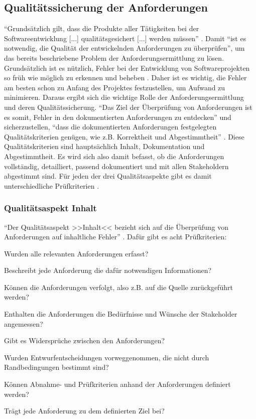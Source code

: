 \documentclass [12pt, a4paper, oneside, titlepage, ngerman]{article}
\begin{document}
\subsection{Qualitätssicherung der Anforderungen}
"`Grundsätzlich gilt, dass die Produkte aller Tätigkeiten bei der Softwareentwicklung [...] qualitätsgesichert [...] werden müssen"' \cite[S.55]{Winter1999}. Damit "`ist es notwendig, die Qualität der entwickelnden Anforderungen zu überprüfen"'\cite[S.95]{PohlRupp2015}, um das bereits beschriebene Problem der Anforderungsermittlung zu lösen. \\
Grundsätzlich ist es nützlich, Fehler bei der Entwicklung von Softwareprojekten so früh wie möglich zu erkennen und beheben \cite[vgl. S.2]{Hussmann}. Daher ist es wichtig, die Fehler am besten schon zu Anfang des Projektes festzustellen, um Aufwand zu minimieren. Daraus ergibt sich die wichtige Rolle der Anforderungsermittlung und deren Qualitätssicherung. 
"`Das Ziel der Überprüfung von Anforderungen ist es somit, Fehler in den dokumentierten Anforderungen zu entdecken"' und sicherzustellen, "`dass die dokumentierten Anforderungen festgelegten Qualitätskriterien genügen, wie z.B. Korrektheit und Abgestimmtheit"' \cite[S.95]{PohlRupp2015}. Diese Qualitätskriterien sind hauptsächlich Inhalt, Dokumentation und Abgestimmtheit. Es wird sich also damit befasst, ob die Anforderungen vollständig, detailliert, passend dokumentiert und mit allen Stakeholdern abgestimmt sind. Für jeden der drei Qualitätsaspekte gibt es damit unterschiedliche Prüfkriterien \cite[vgl.S. 97]{PohlRupp2015}.

\subsubsection{Qualitätsaspekt Inhalt}
"`Der Qualitätsaspekt >>Inhalt<< bezieht sich auf die Überprüfung von Anforderungen auf inhaltliche Fehler"' \cite[S.98]{PohlRupp2015}. Dafür gibt es acht Prüfkriterien\cite[vgl. S.98]{PohlRupp2015}: 
\begin{description}[font=\itshape]\setlength\itemsep{0em}
\item[Vollständigkeit:] Wurden alle relevanten Anforderungen erfasst?
\item[Vollständigkeit(einzeln):] Beschreibt jede Anforderung die dafür notwendigen Informationen?
\item[Verfolgbarkeit:] Können die Anforderungen verfolgt, also z.B. auf die Quelle zurückgeführt werden?
\item[Adäquatheit:] Enthalten die Anforderungen die Bedürfnisse und Wünsche der Stakeholder angemessen?
\item[Konsistenz:] Gibt es Widersprüche zwischen den Anforderungen?
\item[Vorzeitige Entwurfsentscheidungen:] Wurden Entwurfentscheidungen vorweggenommen, die nicht durch Randbedingungen bestimmt sind?
\item[Überprüfbarkeit:] Können Abnahme- und Prüfkriterien anhand der Anforderungen definiert werden?
\item[Notwendigkeit:] Trägt jede Anforderung zu dem definierten Ziel bei?
\end{description}
\end{document}
